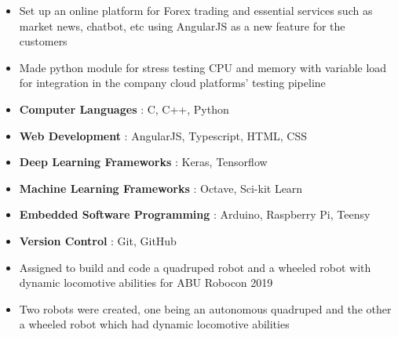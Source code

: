 \documentclass[10pt,a4paper,ragged2e,withhyper]{altacv}
\begin{document}
\begin{paracol}{2}


\begin{itemize}
\item Set up an online platform for Forex trading and essential services such as market news, chatbot, etc using AngularJS as a new feature for the customers
\item Made python module for stress testing CPU and memory with variable load for integration in the company cloud platforms' testing pipeline
\end{itemize}

\begin{comment}
\cvsection{Technical Skills}
\cvskill{C/C++, Python, Java}{4}
\cvskill{Deep Learning}{4}
\cvskill{Computer Vision}{4}
\cvskill{Machine Learning}{3}
\cvskill{Databases}{3}
\cvskill{Robotics}{3}
\cvskill{Web Development}{2}
\end{comment}


\begin{itemize}
    \item \textbf{Computer Languages} : C, C++, Python
    \item \textbf{Web Development} : AngularJS, Typescript, HTML, CSS
    \item \textbf{Deep Learning Frameworks} : Keras, Tensorflow
    \item \textbf{Machine Learning Frameworks} : Octave, Sci-kit Learn
    \item \textbf{Embedded Software Programming} : Arduino, Raspberry Pi, Teensy
    \item \textbf{Version Control} : Git, GitHub
\end{itemize}

\begin{itemize}
    \item Assigned to build and code a quadruped robot and a wheeled robot with dynamic locomotive abilities for
ABU Robocon 2019
    \item Two robots were created, one being an autonomous quadruped and the other a wheeled robot which had dynamic locomotive abilities
\end{itemize}


\end{paracol}
\end{document}
